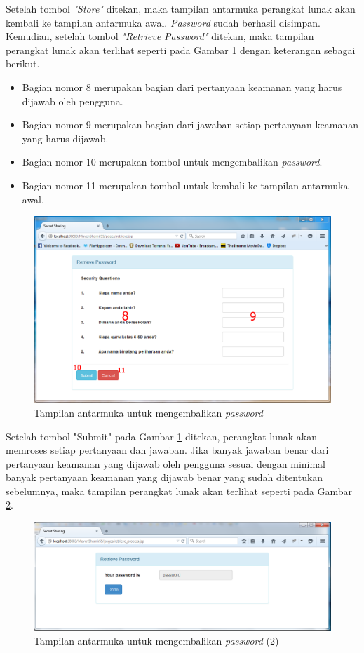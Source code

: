 Setelah tombol \textit{"Store"} ditekan, maka tampilan antarmuka perangkat lunak akan kembali ke tampilan antarmuka awal. \textit{Password} sudah berhasil disimpan. Kemudian, setelah tombol \textit{"Retrieve Password"} ditekan, maka tampilan perangkat lunak akan terlihat seperti pada Gambar \ref{fig:tampilan3} dengan keterangan sebagai berikut.

\begin{itemize}
	\item Bagian nomor 8 merupakan bagian dari pertanyaan keamanan yang harus dijawab oleh pengguna.
	\item Bagian nomor 9 merupakan bagian dari jawaban setiap pertanyaan keamanan yang harus dijawab.
	\item Bagian nomor 10 merupakan tombol untuk mengembalikan \textit{password}.
	\item Bagian nomor 11 merupakan tombol untuk kembali ke tampilan antarmuka awal.
\end{itemize}

\begin{figure}[H]
	\includegraphics[scale=0.5]{Gambar/tampilan3}
	\centering
	\caption{Tampilan antarmuka untuk mengembalikan \textit{password}}\label{fig:tampilan3}
\end{figure}

Setelah tombol "Submit" pada Gambar \ref{fig:tampilan3} ditekan, perangkat lunak akan memroses setiap pertanyaan dan jawaban. Jika banyak jawaban benar dari pertanyaan keamanan yang dijawab oleh pengguna sesuai dengan minimal banyak pertanyaan keamanan yang dijawab benar yang sudah ditentukan sebelumnya, maka tampilan perangkat lunak akan terlihat seperti pada Gambar \ref{fig:tampilan4}.

\begin{figure}[H]
	\includegraphics[scale=0.5]{Gambar/tampilan4}
	\centering
	\caption{Tampilan antarmuka untuk mengembalikan \textit{password} (2)}\label{fig:tampilan4}
\end{figure}

